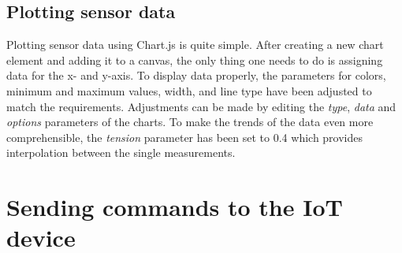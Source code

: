 \subsection{Plotting sensor data}
\label{subsec:plot_sensor_data}
Plotting sensor data using Chart.js is quite simple. After creating a new chart element and adding it to a canvas, the only thing one needs to do is assigning data for the x- and y-axis. To display data properly, the parameters for colors, minimum and maximum values, width, and line type have been adjusted to match the requirements. Adjustments can be made by editing the  \textit{type},  \textit{data} and  \textit{options} parameters of the charts. To make the trends of the data even more comprehensible, the \textit{tension} parameter has been set to 0.4 which provides interpolation between the single measurements.



\section{Sending commands to the IoT device}
\label{subsec:send_command}

